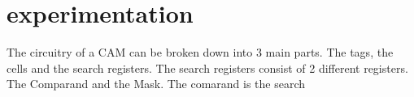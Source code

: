 \section{experimentation}
The circuitry of a CAM can be broken down into 3 main parts. The tags, the cells and the search registers. 
The search registers consist of 2 different registers. The Comparand and the Mask. The comarand is the search 